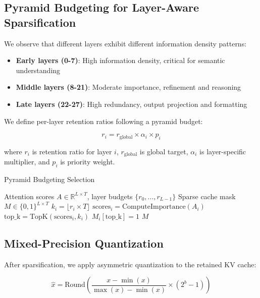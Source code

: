 \documentclass{article}
\begin{document}
\subsection{Pyramid Budgeting for Layer-Aware Sparsification}

We observe that different layers exhibit different information density patterns:

\begin{itemize}
\item \textbf{Early layers (0-7)}: High information density, critical for semantic understanding
\item \textbf{Middle layers (8-21)}: Moderate importance, refinement and reasoning
\item \textbf{Late layers (22-27)}: High redundancy, output projection and formatting
\end{itemize}

We define per-layer retention ratios following a pyramid budget:

\begin{equation}
r_i = r_{\text{global}} \times \alpha_i \times p_i
\end{equation}

where $r_i$ is retention ratio for layer $i$, $r_{\text{global}}$ is global target, $\alpha_i$ is layer-specific multiplier, and $p_i$ is priority weight.

\begin{algorithm}
\caption{Pyramid Budgeting Selection}
\begin{algorithmic}[1]
\REQUIRE Attention scores $A \in \mathbb{R}^{L \times T}$, layer budgets $\{r_0, ..., r_{L-1}\}$
\ENSURE Sparse cache mask $M \in \{0,1\}^{L \times T}$
    \STATE $k_i = \lfloor r_i \times T \rfloor$
    \STATE $\text{scores}_i = \text{ComputeImportance}(A_i)$
    \STATE $\text{top\_k} = \text{TopK}(\text{scores}_i, k_i)$
    \STATE $M_i[\text{top\_k}] = 1$
\ENDFOR
\RETURN $M$
\end{algorithmic}
\end{algorithm}

\subsection{Mixed-Precision Quantization}

After sparsification, we apply asymmetric quantization to the retained KV cache:

\begin{equation}
\hat{x} = \text{Round}\left(\frac{x - \min(x)}{\max(x) - \min(x)} \times (2^b - 1)\right)
\end{equation}
\end{document}
